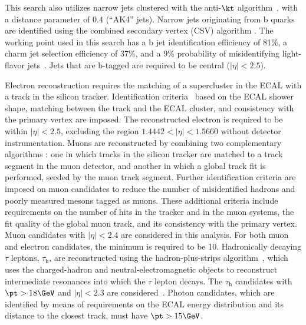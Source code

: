 This search also utilizes narrow jets clustered
with the anti-$\kt$ algorithm~\cite{Cacciari:2008gp}, with a distance
parameter of $0.4$ (“AK4” jets). Narrow jets originating from b quarks are identified using the combined secondary vertex (CSV) algorithm \cite{Sirunyan:2017ezt, BTV-paper-2012-001}. The working point used in this search has a b jet identification efficiency of 81\%, a charm jet selection efficiency of 37\%, and a 9\% probability of misidentifying light-flavor jets~\cite{Sirunyan:2017ezt}. Jets that are b-tagged are required to be central ($|\eta|<2.5$).

Electron reconstruction requires the matching of a supercluster in the ECAL with a track in the silicon tracker.
Identification criteria~\cite{Khachatryan:2015hwa} based on the ECAL shower shape, matching between the track and the ECAL cluster, and consistency with the primary vertex are imposed. The reconstructed electron is required to be within $|\eta|< 2.5$, excluding the region $1.4442<|\eta|<1.5660$ without detector instrumentation. Muons are reconstructed by combining two complementary algorithms \cite{CMSMuonJINST}:
 one in which tracks in the silicon tracker are matched to a track segment in the muon detector, and another in which a global track fit is performed, seeded by the muon track segment.  
Further identification criteria are imposed on muon candidates to reduce the number of misidentified hadrons and poorly measured mesons tagged as muons. 
These additional criteria include requirements on the number of hits in the tracker and in the muon systems, the fit quality of the global muon track, and its consistency with the primary vertex.
Muon candidates with $|\eta|< 2.4$ are considered in this analysis. 
For both muon and electron candidates, the minimum \pt is required to be 10\GeV.
Hadronically decaying $\tau$ leptons, $\tau_\mathrm{h}$, are reconstructed using the hadron-plus-strips
  algorithm~\cite{CMSTauJINST}, which uses the charged-hadron and neutral-electromagnetic objects 
to reconstruct intermediate resonances into which the $\tau$ lepton decays. The $\tau_\mathrm{h}$
candidates with $\pt>18\GeV$ and $|\eta|< 2.3$ are considered~\cite{Khachatryan:2015hwa,Chatrchyan:2013sba,CMSTauJINST}. Photon candidates, which are identified by means of requirements on the ECAL energy distribution and its distance to the closest track,  must have $\pt>15\GeV$. %

